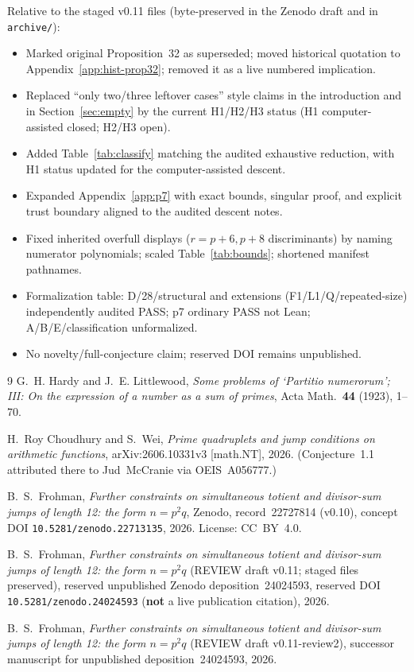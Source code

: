 \documentclass[11pt,reqno]{amsart}
\theoremstyle{definition}
\begin{document}
Relative to the staged v0.11 files (byte-preserved in the Zenodo draft and in \texttt{archive/}):
\begin{itemize}
\item Marked original Proposition~32 as superseded; moved historical quotation to Appendix~\ref{app:hist-prop32}; removed it as a live numbered implication.
\item Replaced ``only two/three leftover cases'' style claims in the introduction and in Section~\ref{sec:empty} by the current H1/H2/H3 status (H1 computer-assisted closed; H2/H3 open).
\item Added Table~\ref{tab:classify} matching the audited exhaustive reduction, with H1 status updated for the computer-assisted descent.
\item Expanded Appendix~\ref{app:p7} with exact bounds, singular proof, and explicit trust boundary aligned to the audited descent notes.
\item Fixed inherited overfull displays (\(r=p+6,p+8\) discriminants) by naming numerator polynomials; scaled Table~\ref{tab:bounds}; shortened manifest pathnames.
\item Formalization table: D/28/structural and extensions (F1/L1/Q/repeated-size) independently audited PASS; p7 ordinary PASS not Lean; A/B/E/classification unformalized.
\item No novelty/full-conjecture claim; reserved DOI remains unpublished.
\end{itemize}


\begin{thebibliography}{9}
G.~H. Hardy and J.~E. Littlewood,
\textit{Some problems of `Partitio numerorum'; III: On the expression of a number as a sum of primes},
Acta Math.\ \textbf{44} (1923), 1--70.

H.~Roy Choudhury and S.~Wei,
\textit{Prime quadruplets and jump conditions on arithmetic functions},
arXiv:2606.10331v3 [math.NT], 2026.
(Conjecture~1.1 attributed there to Jud~McCranie via OEIS~A056777.)

B.~S.~Frohman,
\textit{Further constraints on simultaneous totient and divisor-sum jumps of length 12: the form \(n=p^2q\)},
Zenodo, record~22727814 (v0.10), concept DOI \texttt{10.5281/zenodo.22713135}, 2026.
License: CC~BY~4.0.

B.~S.~Frohman,
\textit{Further constraints on simultaneous totient and divisor-sum jumps of length 12: the form \(n=p^2q\)} (REVIEW draft v0.11; staged files preserved),
reserved unpublished Zenodo deposition~24024593, reserved DOI \texttt{10.5281/zenodo.24024593} (\textbf{not} a live publication citation), 2026.

B.~S.~Frohman,
\textit{Further constraints on simultaneous totient and divisor-sum jumps of length 12: the form \(n=p^2q\)} (REVIEW draft v0.11-review2),
successor manuscript for unpublished deposition~24024593, 2026.
\end{thebibliography}
\end{document}

